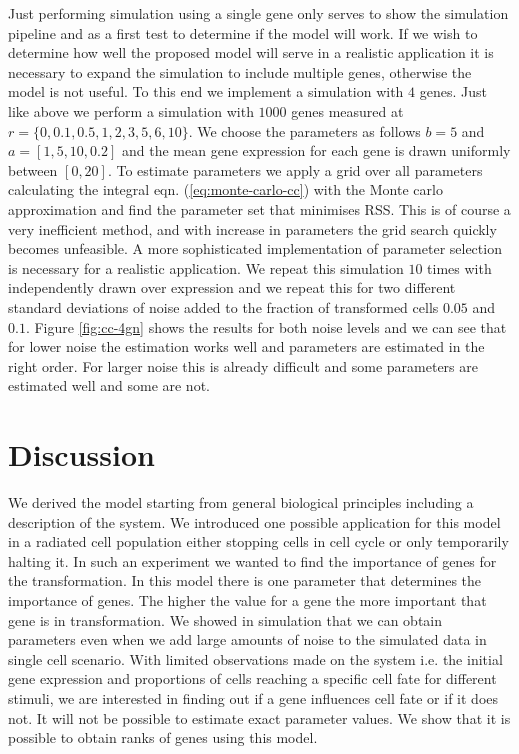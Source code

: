 Just performing simulation using a single gene only serves to show the simulation pipeline and as a first test to determine if the model will work. If we wish to determine how well the proposed model will serve in a realistic application it is necessary to expand the simulation to include multiple genes, otherwise the model is not useful. To this end we implement a simulation with $4$ genes. Just like above we perform a simulation with $1000$ genes measured at $r =\lbrace 0, 0.1, 0.5, 1, 2, 3, 5, 6, 10 \rbrace$. We choose the parameters as follows $b=5$ and $a=[1, 5, 10, 0.2]$ and the mean gene expression for each gene is drawn uniformly between $[0, 20]$. To estimate parameters we apply a grid over all parameters calculating the integral eqn. (\ref{eq:monte-carlo-cc}) with the Monte carlo approximation and find the parameter set that minimises RSS. This is of course a very inefficient  method,  and with increase in parameters the grid search quickly becomes unfeasible. A more sophisticated implementation of parameter selection is necessary for a realistic application.  We repeat this simulation $10$ times with independently drawn over expression and we repeat this for two different standard deviations of noise added to the fraction of transformed cells $0.05$ and $0.1$. Figure \ref{fig:cc-4gn} shows the results for both noise levels and we can see that for lower noise the estimation works well and parameters are estimated in the right order. For larger noise this is already difficult and some parameters are estimated well and some are not. 



\section{Discussion}
\label{sec:discussion-cc}

We derived the model starting from general biological principles including a description of the system. We introduced one possible application for this model in a radiated cell population either stopping cells in cell cycle or only temporarily halting it. In such an experiment we wanted to find the importance of genes for the transformation.  In this model there is one parameter that determines the importance of genes. The higher the value for a gene the more important that gene is in transformation. We showed in simulation that we can obtain parameters even when we add large amounts of noise to the simulated data in single cell scenario. With limited observations made on the system i.e. the initial gene expression and proportions of cells reaching a specific cell fate for different stimuli, we are interested in finding out if a gene influences cell fate or if it does not. It will not be possible to estimate exact parameter values. We show that it is possible to obtain ranks of genes using this model.

